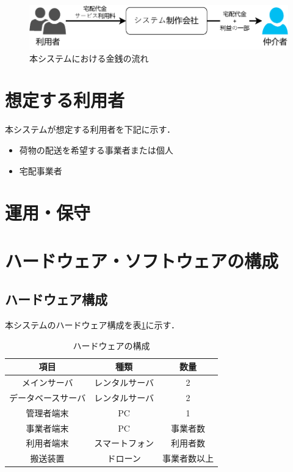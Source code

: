 \documentclass[a4paper, titlepage]{jsarticle}
\begin{document}
\begin{figure}[H]
  \centering
  \includegraphics[width=0.6\linewidth]{./money_flow.pdf}
  \caption{本システムにおける金銭の流れ}
  \label{fig:money_flow_1}
\end{figure}


\section{想定する利用者}
本システムが想定する利用者を下記に示す．
\begin{itemize}
        \item 荷物の配送を希望する事業者または個人
        \item 宅配事業者
\end{itemize}

\section{運用・保守}

\section{ハードウェア・ソフトウェアの構成}
\subsection{ハードウェア構成}
本システムのハードウェア構成を表\ref{fig:hardware}に示す．
\begin{table}[H]
 \begin{center}
  \caption{ハードウェアの構成}
    \label{fig:hardware}
  \begin{tabular}{ccc} \hline
    項目 & 種類 & 数量 \\ \hline \hline
    メインサーバ & レンタルサーバ & 2 \\
    データベースサーバ & レンタルサーバ & 2 \\
    管理者端末 & PC & 1 \\
    事業者端末 & PC & 事業者数 \\
    利用者端末 & スマートフォン & 利用者数 \\
    搬送装置 & ドローン & 事業者数以上 \\ \hline
  \end{tabular}
 \end{center}
\end{table}
\end{document}
